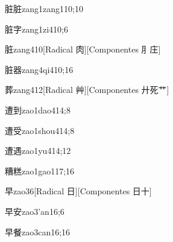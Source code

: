 \begin{verbete}{脏脏}{zang1zang1}{10;10}
\end{verbete}

\begin{verbete}{脏字}{zang1zi4}{10;6}
\end{verbete}

\begin{verbete}{脏}{zang4}{10}[Radical 肉][Componentes ⺼庄]
\end{verbete}

\begin{verbete}{脏器}{zang4qi4}{10;16}
\end{verbete}

\begin{verbete}{葬}{zang4}{12}[Radical 艸][Componentes 廾死艹]
\end{verbete}

\begin{verbete}{遭到}{zao1dao4}{14;8}
\end{verbete}

\begin{verbete}{遭受}{zao1shou4}{14;8}
\end{verbete}

\begin{verbete}{遭遇}{zao1yu4}{14;12}
\end{verbete}

\begin{verbete}{糟糕}{zao1gao1}{17;16}
\end{verbete}

\begin{verbete}{早}{zao3}{6}[Radical 日][Componentes 日十]
\end{verbete}

\begin{verbete}{早安}{zao3'an1}{6;6}
\end{verbete}

\begin{verbete}{早餐}{zao3can1}{6;16}
\end{verbete}


